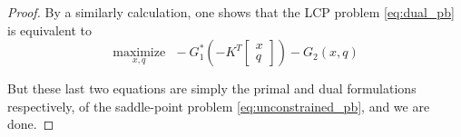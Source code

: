 \documentclass[12pt]{article}
\begin{document}
\begin{proof}
By a similarly calculation, one shows that the LCP problem \eqref{eq:dual_pb} is equivalent to
\begin{equation}
  \underset{x,q}{\text{maximize}}\text{ }-G_1^*\left(-K^T\begin{bmatrix}x\\q\end{bmatrix}\right) - G_2(x, q)
\end{equation}

But these last two equations are simply the primal and dual formulations respectively, of the saddle-point problem \eqref{eq:unconstrained_pb}, and we are done.


\end{proof}
\end{document}
